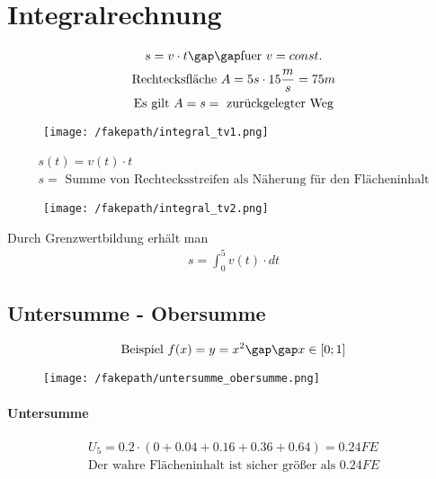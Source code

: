 \chapter{Integralrechnung}
\begin{gather*}
  s = v \cdot t \gap\gap\text{fuer } v = const. \\
  \text{Rechtecksfläche } A = 5s \cdot 15\frac{m}{s} = 75m \\
  \text{Es gilt } A = s = \text{ zurückgelegter Weg}
\end{gather*}
\begin{figure}[H]
  \centering
  \texttt{[image: /fakepath/integral\_tv1.png]}
\end{figure}
\newpage
\begin{gather*}
  s(t) = v(t) \cdot t \\
  s = \text{ Summe von Rechtecksstreifen als Näherung für den Flächeninhalt}
\end{gather*}
\begin{figure}[H]
  \centering
  \texttt{[image: /fakepath/integral\_tv2.png]}
\end{figure}
Durch Grenzwertbildung erhält man
\begin{gather*}
  s = \int_0^5 v(t) \cdot dt
\end{gather*}
\section{Untersumme - Obersumme}
\begin{gather*}
  \text{Beispiel } f(x) = y = x^2 \gap\gap x \in \left[0; 1\right]
\end{gather*}
\begin{figure}[H]
  \centering
  \texttt{[image: /fakepath/untersumme\_obersumme.png]}
\end{figure}
\subsubsection{Untersumme}
\begin{gather*}
  U_5 = 0.2 \cdot (0 + 0.04 + 0.16 + 0.36 + 0.64) = 0.24FE \\
  \text{Der wahre Flächeninhalt ist sicher größer als } 0.24FE
\end{gather*}
